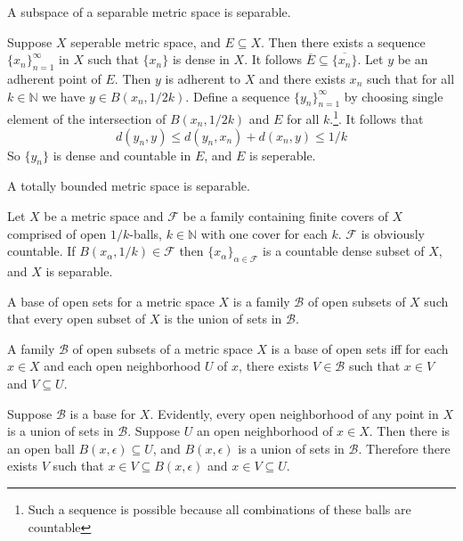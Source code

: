\documentclass[nobib,notoc]{tufte-handout}
\begin{document}
\begin{thm}
	A subspace of a separable metric space is separable.
	\begin{IEEEproof}
		Suppose \(X\) seperable metric space, and \(E\subseteq X\). Then there exists a sequence \(\{x_n\}_{n=1}^\infty\) in \(X\) such that \(\{x_n\}\) is dense in \(X\). It follows \(\overline{E}\subseteq\overline{\{x_n\}}\). Let \(y\) be an adherent point of \(E\). Then \(y\) is adherent to \(X\) and there exists \(x_n\) such that for all \(k\in\mathbb{N}\) we have \(y\in B(x_n, 1/2k)\). Define a sequence \(\{y_n\}_{n=1}^\infty\) by choosing single element of the intersection of \(B(x_n, 1/2k)\) and \(E\) for all \(k\).\footnote{Such a sequence is possible because all combinations of these balls are countable}. It follows that
		\begin{equation*}
			d(y_n,y)\leq d(y_n,x_n)+d(x_n, y)\leq 1/k
		\end{equation*}
		So \(\{y_n\}\) is dense and countable in \(E\), and \(E\) is seperable.
	\end{IEEEproof}
\end{thm}
\begin{thm}
	\label{tbseperable}
	A totally bounded metric space is separable.
	\begin{IEEEproof}
		Let \(X\) be a metric space and \(\mathscr{F}\) be a family containing finite covers of \(X\) comprised of open \(1/k\)-balls, \(k\in\mathbb{N}\) with one cover for each \(k\). \(\mathscr{F}\) is obviously countable. If \(B(x_\alpha, 1/k)\in\mathscr{F}\) then \(\{x_\alpha\}_{\alpha\in\mathscr{F}}\) is a countable dense subset of \(X\), and \(X\) is separable.
	\end{IEEEproof}
\end{thm}
\begin{defi}[Base]
	A base of open sets for a metric space \(X\) is a family \(\mathscr{B}\) of open subsets of \(X\) such that every open subset of \(X\) is the union of sets in \(\mathscr{B}\).
\end{defi}
\begin{lem}
	\label{baseinocover}
	A family \(\mathscr{B}\) of open subsets of a metric space \(X\) is a base of open sets iff for each \(x\in X\) and each open neighborhood \(U\) of \(x\), there exists \(V\in\mathscr{B}\) such that \(x\in V\) and \(V\subseteq U\).
	\begin{IEEEproof}
		Suppose \(\mathscr{B}\) is a base for \(X\). Evidently, every open neighborhood of any point in \(X\) is a union of sets in \(\mathscr{B}\). Suppose \(U\) an open neighborhood of \(x\in X\). Then there is an open ball \(B(x,\epsilon)\subseteq U\), and \(B(x,\epsilon)\) is a union of sets in \(\mathscr{B}\). Therefore there exists \(V\) such that \(x\in V\subseteq B(x,\epsilon)\) and \(x\in V\subseteq U\).
	\end{IEEEproof}
\end{lem}
\end{document}
